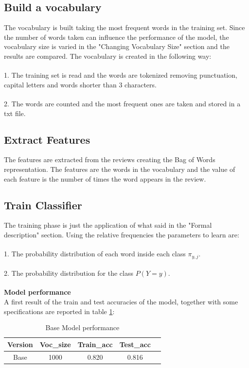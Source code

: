 \documentclass{article}
\begin{document}
\begin{multicols}{2}
\subsection{Build a vocabulary}
The vocabulary is built taking the most frequent words in the training set. Since the number of words taken can influence the performance of the model, the vocabulary
size is varied in the "Changing Vocabulary Size" section and the results are compared. The vocabulary is created in the following way:\\
\\
1. The training set is read and the words are tokenized removing punctuation, capital letters and words shorter than 3 characters.\\
\\
2. The words are counted and the most frequent ones are taken and stored in a txt file.


\subsection{Extract Features}
The features are extracted from the reviews creating the Bag of Words representation. The features are the words in the vocabulary and the value of each feature is the
number of times the word appears in the review.

\subsection{Train Classifier}
The training phase is just the application of what said in the "Formal description" section. Using the relative frequencies the parameters to learn are:\\
\\
1. The probability distribution of each word inside each class $\pi_{y,j}$.\\
\\
2. The probability distribution for the class $P(Y = y)$.\\
\\
\textbf{Model performance}\\
A first result of the train and test accuracies of the model, together with some specifications are reported in table \ref{tab:base_model}:

    \begin{table}[H]
        \centering
        \small
        \caption{\small Base Model performance}
        \label{tab:base_model}
        \begin{tabular}{|c|c|c|c|c|}
        \hline
        \textbf{Version}  & \textbf{Voc\_size} & \textbf{Train\_acc} & \textbf{Test\_acc}\\
        \hline
        Base & 1000 & 0.820 & 0.816\\
        \hline
        \end{tabular}
    \end{table}


\end{multicols}
\end{document}
